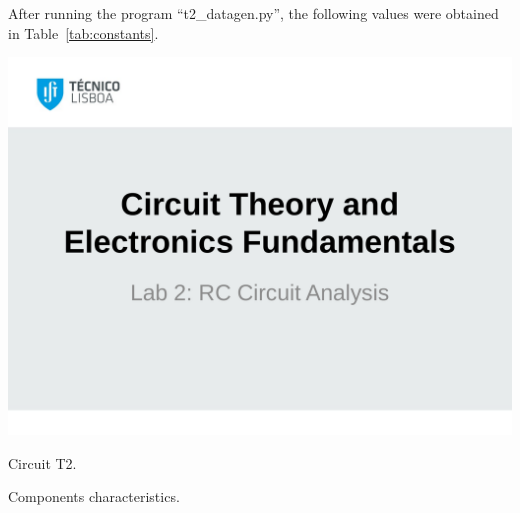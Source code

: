 After running the program ``t2\_datagen.py'', the following values were obtained in Table~\ref{tab:constants}.

\begin{minipage}[b]{0.48\textwidth}
\centering
    \includegraphics[width=0.9\linewidth]{t2.pdf}
    \captionsetup{type=figure}
\caption{Circuit T2.}
\label{fig:t2}
\end{minipage}
\begin{minipage}[b]{0.48\textwidth}
\centering
   
    \captionsetup{type=table}
  \caption{Components characteristics.}
  \label{tab:constants}
\end{minipage}

